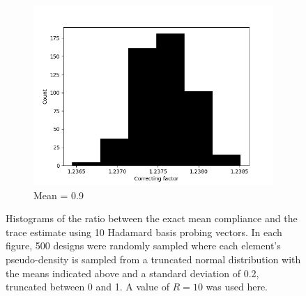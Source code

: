 \begin{figure}[!htbp]
\begin{subfigure}{0.45\textwidth}
    \includegraphics[width=1\textwidth]{./images/robust_approx/correcting_factors_hadamard_mean_10_09.png}
    \caption{Mean = 0.9}
  \end{subfigure}
  \caption{Histograms of the ratio between the exact mean compliance and the trace estimate using 10 Hadamard basis probing vectors. In each figure, 500 designs were randomly sampled where each element's pseudo-density is sampled from a truncated normal distribution with the means indicated above and a standard deviation of 0.2, truncated between 0 and 1. A value of $R = 10$ was used here.}
  \label{fig:correcting_mean}
\end{figure}
